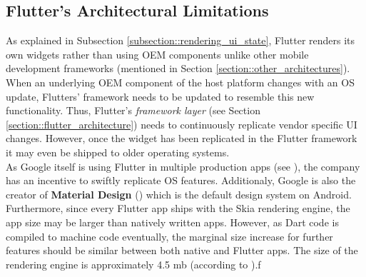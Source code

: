 \subsection{Flutter's Architectural Limitations}
As explained in Subsection \ref{subsection::rendering_ui_state}, Flutter renders its own widgets rather than using OEM components unlike other mobile development frameworks (mentioned in Section \ref{section::other_architectures}). 
When an underlying OEM component of the host platform changes with an OS update, Flutters' framework needs to be updated to resemble this new 
functionality. 
Thus, Flutter's \textit{framework layer} (see Section \ref{section::flutter_architecture}) needs to continuously replicate vendor specific UI changes.
However, once the widget has been replicated in the Flutter framework it may even be shipped to older operating systems.\\
As Google itself is using Flutter in multiple production apps (see \cite{FlutterShowcase2021}), the company has an incentive to swiftly replicate OS features.
Additionaly, Google is also the creator of \textbf{Material Design} (\cite{Google2021}) which is the default design system on Android.\\
Furthermore, since every Flutter app ships with the Skia rendering engine, the app size may be larger than natively written apps.
However, as Dart code is compiled to machine code eventually, the marginal size increase for further features should be similar between both native 
and Flutter apps.
The size of the rendering engine is approximately 4.5 mb (according to \cite{FlutterFAQ2021}).ƒ
